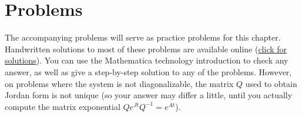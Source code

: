 

\section{Problems}
The accompanying problems will serve as practice problems for this chapter.  Handwritten solutions to most of these problems are available online 
(\href{https://content.byui.edu/file/664390b8-e9cc-43a4-9f3c-70362f8b9735/1/10-Systems-of-ODEs-Preparation-Solutions.pdf}{click for solutions}).
You can use the Mathematica technology introduction to check any answer, as well as give a step-by-step solution to any of the problems. However, on problems where the system is not diagonalizable, the matrix $Q$ used to obtain Jordan form is not unique (so your answer may differ a little, until you actually compute the matrix exponential $Qe^{Jt}Q^{-1}=e^{At}$).


